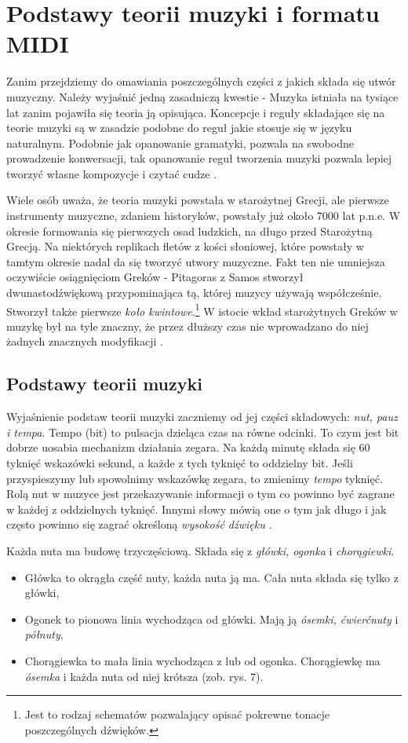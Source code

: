 \chapter{Podstawy teorii muzyki i formatu MIDI} 
Zanim przejdziemy do omawiania poszczególnych części z jakich składa się utwór muzyczny. Należy wyjaśnić jedną zasadniczą kwestie - Muzyka istniała na tysiące lat zanim pojawiła się teoria ją opisująca.
Koncepcje i reguły składające się na teorie muzyki są w zasadzie podobne do reguł jakie stosuje się w języku naturalnym. Podobnie jak opanowanie gramatyki, pozwala na swobodne prowadzenie konwersacji, tak opanowanie reguł tworzenia muzyki pozwala lepiej tworzyć własne kompozycje i czytać cudze \citep[s. 22]{Pilhofer2018}.

Wiele osób uważa, że teoria muzyki powstała w starożytnej Grecji, ale pierwsze instrumenty muzyczne, zdaniem historyków, powstały już około 7000 lat p.n.e. W okresie formowania się pierwszych osad ludzkich, na długo przed Starożytną Grecją. Na niektórych replikach fletów z kości słoniowej, które powstały w tamtym okresie nadal da się tworzyć utwory muzyczne. Fakt ten nie umniejsza oczywiście osiągnięciom Greków - Pitagoras z Samos stworzył dwunastodźwiękową przypominająca tą, której muzycy używają współcześnie. Stworzył także pierwsze \textit{koło kwintowe}.\footnote{Jest to rodzaj schematów pozwalający opisać pokrewne tonacje poszczególnych dźwięków.} W istocie wkład starożytnych Greków w muzykę był na tyle znaczny, że przez dłuższy czas nie wprowadzano do niej żadnych znacznych modyfikacji \citep[s. 23]{Pilhofer2018}.

\section{Podstawy teorii muzyki} 
Wyjaśnienie podstaw teorii muzyki zaczniemy od jej części składowych: \textit{nut, pauz i tempa}.
Tempo (bit) to pulsacja dzieląca czas na równe odcinki. To czym jest bit dobrze uosabia mechanizm działania zegara. Na każdą minutę składa się 60 tyknięć wskazówki sekund, a każde z tych tyknięć to oddzielny bit. Jeśli przyspieszymy lub spowolnimy wskazówkę zegara, to zmienimy \textit{tempo} tyknięć. Rolą nut w muzyce jest przekazywanie informacji o tym co powinno być zagrane w każdej z oddzielnych tyknięć. Innymi słowy mówią one o tym jak długo i jak często powinno się zagrać określoną \textit{wysokość dźwięku} \citep[s. 31]{Pilhofer2018}.

Każda nuta ma budowę trzyczęściową. Składa się z \textit{główki, ogonka} i \textit{chorągiewki}.
\begin{itemize}
 \item Główka to okrągła część nuty, każda nuta ją ma. Cała nuta składa się tylko z główki,
 \item Ogonek to pionowa linia wychodząca od główki. Mają ją \textit{ósemki, ćwierćnuty} i \textit{półnuty},
 \item Chorągiewka to mała linia wychodząca z lub od ogonka. Chorągiewkę ma \textit{ósemka} i każda nuta od niej krótsza \citep[s. 32-33]{Pilhofer2018} (zob. rys. 7).
\end{itemize}

